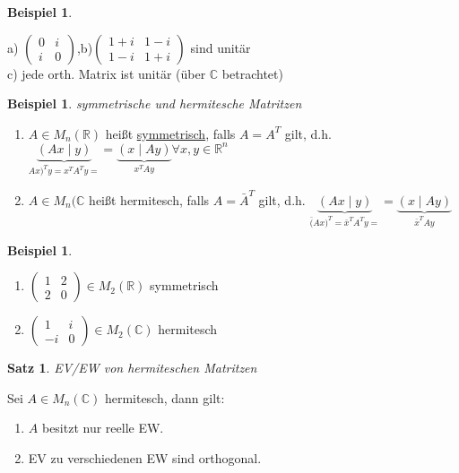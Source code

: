 \documentclass[a4paper,11pt]{article}
\newtheorem{satz}[definition]{Satz}
\newtheorem{bsp}[definition]{Beispiel}
\newcommand{\hsp}{\hspace{5mm}}
\begin{document}
\begin{bsp}
\end{bsp}
a) $\begin{pmatrix}0&i\\i&0\end{pmatrix}$,\hsp b)$\begin{pmatrix}1+i&1-i\\1-i&1+i\end{pmatrix}$ sind unitär \\
c) jede orth. Matrix ist unitär (über $\mathbb{C}$ betrachtet)

\begin{bsp}
	symmetrische und hermitesche Matritzen
\end{bsp}
\begin{enumerate}[label=\alph*)]
	\item $A\in M_n(\mathbb{R})$ heißt \underline{symmetrisch}, falls $A=A^T$ gilt, d.h. $\underbrace{(Ax\mid y)}_{Ax)^Ty=x^TA^Ty=}=\underbrace{(x\mid Ay)}_{x^TAy} 
	\forall x,y\in\mathbb{R}^n$
	\item $A\in M_n(\mathbb{C}$ heißt hermitesch, falls $A=\bar A^T$ gilt, d.h. $\underbrace{(Ax\mid y)}_{\bar(Ax)^T=\bar x^TA^Ty=}=\underbrace{(x\mid Ay)}_{\bar x^TAy}$
\end{enumerate}

\begin{bsp}
\end{bsp}
\begin{enumerate}[label=\alph*)]
	\item $\begin{pmatrix}1&2\\2&0\end{pmatrix}\in M_2(\mathbb{R})$ symmetrisch
	\item $\begin{pmatrix}1&i\\-i&0\end{pmatrix}\in M_2(\mathbb{C})$ hermitesch
\end{enumerate}

\newpage

\begin{satz}
	EV/EW von hermiteschen Matritzen
\end{satz}
Sei $A\in M_n(\mathbb{C})$ hermitesch, dann gilt:
\begin{enumerate}[label=\alph*)]
	\item $A$ besitzt nur reelle EW.
	\item EV zu verschiedenen EW sind orthogonal.
\end{enumerate}
\end{document}

